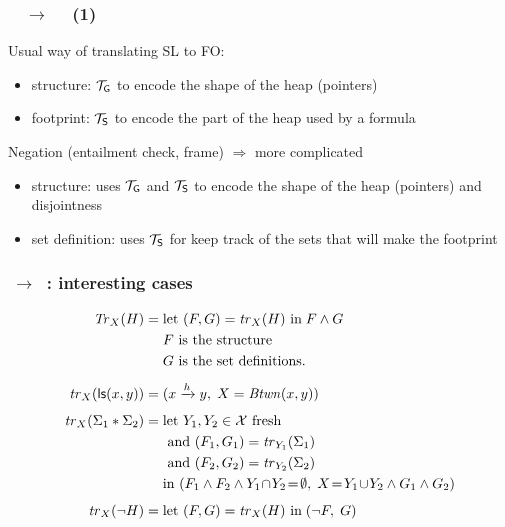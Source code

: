\documentclass{beamer}
\begin{document}
\begin{frame}
  \frametitle{\JoshLogic $\quad \rightarrow \quad$ \LRJQ (1)}

  Usual way of translating SL to FO:
  \begin{itemize}
  \item structure: $\mathcal{T}_{\mathsf{G}}$ to encode the shape of the heap (pointers)
  \item footprint: $\mathcal{T}_{\mathsf{S}}$ to encode the part of the heap used by a formula
  \end{itemize}

  \vspace{2ex}
  
  Negation (entailment check, frame) $\Rightarrow$ more complicated 
  \begin{itemize}
  \item structure: uses $\mathcal{T}_{\mathsf{G}}$ and $\mathcal{T}_{\mathsf{S}}$ to encode the shape of the heap (pointers) and disjointness
  \item set definition: uses $\mathcal{T}_{\mathsf{S}}$ for keep track of the sets that will make the footprint
  \end{itemize}
  
\end{frame}

\begin{frame}
  \frametitle{\JoshLogic $\ \rightarrow \ $ \LRJQ : interesting cases}
  \begin{align*}
    \trfull{H}{X} = {} & \letin{(F,G)}{\tr_X(H)} \; F \land G \\
    {} & \text{$F$ is the structure} \\
    {} & \text{$G$ is the set definitions.} \\[1ex]
    \tr_{X}(\ls(x,y)) = {} & (\reach{x}{y},\;  X = \Btwn(x,y)) \\[1ex]
    \tr_{X}(\Sigma_1 * \Sigma_2) = {} &
    \text{let } \text{$Y_1,Y_2 \in \vars$ fresh } \\
    & \text{ and } (F_1,G_1) = \tr_{Y_1}(\Sigma_1) \\
    & \text{ and } (F_2,G_2) = \tr_{Y_2}(\Sigma_2)\\
    & \text{in } (F_1 \land F_2 \land Y_1\!\cap\!Y_2\!=\!\emptyset,\;     X\!=\!Y_1\!\cup\!Y_2 \land G_1 \land G_2)\\[1ex]
    \tr_X(\neg H) = {} &
    \letin{(F,G)}{\tr_{X}(H)} \; (\neg F,\; G)
  \end{align*}
  
  
\end{frame}
\end{document}
